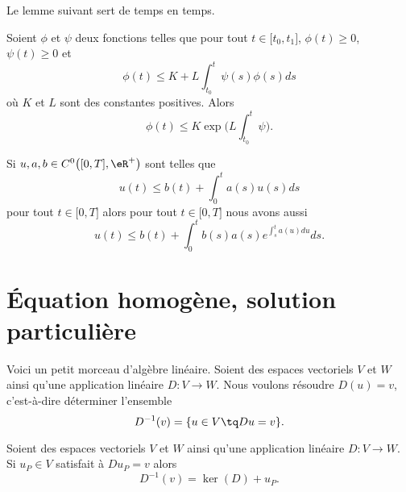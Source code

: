 Le lemme suivant sert de temps en temps.
\begin{lemma}\label{LemuBVozy}
	Soient \( \phi\) et \( \psi\) deux fonctions telles que pour tout \( t\in\mathopen[ t_0 , t_1 \mathclose]\), \( \phi(t)\geq 0\), \( \psi(t)\geq 0\) et
	\begin{equation}
		\phi(t)\leq K +L\int_{t_0}^t\psi(s)\phi(s)ds
	\end{equation}
	où \( K\) et \( L\) sont des constantes positives. Alors
	\begin{equation}
		\phi(t)\leq K\exp\big( L\int_{t_0}^t\psi \big).
	\end{equation}
\end{lemma}

\begin{lemma}        \label{LEMooUGZGooCczAmKa}
	Si \( u,a,b\in C^0\big( \mathopen[ 0 , T \mathclose],\eR^+ \big)\) sont telles que
	\begin{equation}
		u(t)\leq b(t)+\int_0^ta(s)u(s)ds
	\end{equation}
	pour tout \( t\in \mathopen[ 0 , T \mathclose]\) alors pour tout \( t\in \mathopen[ 0 , T \mathclose]\) nous avons aussi
	\begin{equation}
		u(t)\leq b(t)+\int_0^tb(s)a(s) e^{\int_s^ta(u)du}ds.
	\end{equation}
\end{lemma}

\section{Équation homogène, solution particulière}

Voici un petit morceau d'algèbre linéaire. Soient des espaces vectoriels \( V\) et \(W\) ainsi qu'une application linéaire \( D\colon V\to W\). Nous voulons résoudre \( D(u)=v\), c'est-à-dire déterminer l'ensemble
\begin{equation}
	D^{-1}(v)=\{ u\in V\tq Du=v \}.
\end{equation}

\begin{lemma}       \label{LEMooEWUPooXNJMcc}
	Soient des espaces vectoriels \( V\) et \(W\) ainsi qu'une application linéaire \( D\colon V\to W\). Si \( u_P\in V\) satisfait à \( Du_P=v\) alors
	\begin{equation}
		D^{-1}(v)=\ker(D)+u_P.
	\end{equation}
\end{lemma}

